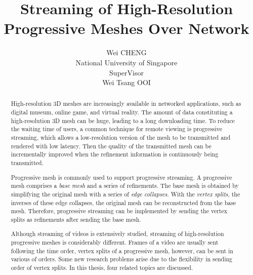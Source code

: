 \documentclass[11pt, a4paper]{report}
\title{Streaming of High-Resolution Progressive Meshes Over Network}
\author{Wei CHENG\\
National University of Singapore\\
SuperVisor\\
Wei Tsang OOI}
\begin{document}
\maketitle
\doublespacing
\begin{abstract}
    High-resolution 3D meshes are increasingly available in networked
    applications, such as digital museum, online game, and virtual reality.
    The amount of data constituting a high-resolution 3D mesh can be
    huge, leading to a long downloading time. 
    To reduce the waiting time of users, 
    a common technique for remote viewing is progressive streaming,
    which allows a low-resolution version of the mesh to be transmitted
    and rendered with low latency. Then the quality of the transmitted 
    mesh can be incrementally improved when the refinement information
    is continuously being transmitted.

    Progressive mesh is commonly used to support progressive
    streaming. A progressive mesh comprises a \emph{base mesh} and a series
    of refinements. The base mesh is obtained by simplifying the original mesh
    with a series of \emph{edge collapses}.
    With the \emph{vertex splits}, the inverses of these edge
    collapses, the original mesh can be reconstructed from the base mesh.
    Therefore, progressive streaming can be implemented by sending the vertex
    splits as refinements after sending the base mesh.

    Although streaming of videos is extensively studied, 
    streaming of high-resolution progressive meshes is considerably different.
    Frames of a video are usually sent following the time order,
    vertex splits of a progressive mesh, however, can be sent in various of orders.
    Some new research problems arise due to the flexibility in sending order of 
    vertex splits. In this thesis, four related topics are discussed. 
    

       

\end{abstract}
\end{document}
